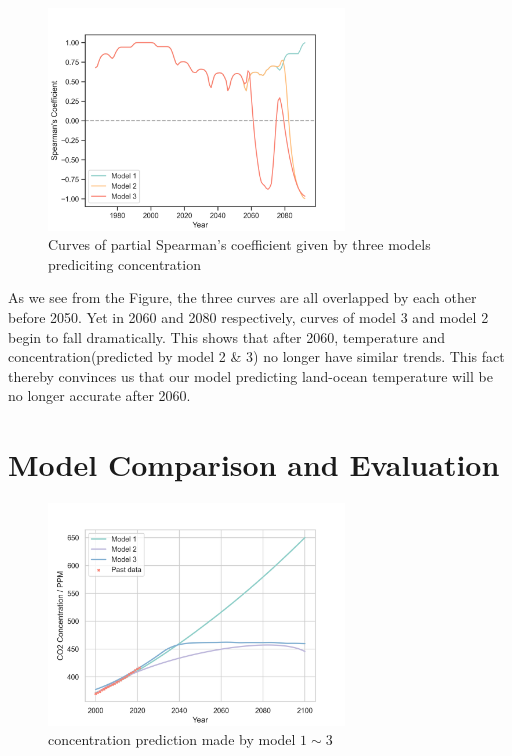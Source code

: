 \documentclass[12pt]{article}
\begin{document}
\begin{figure}[hbt]
    \centering
    \includegraphics[width = 0.7\textwidth]{fig/2b.png}
    \caption{Curves of partial Spearman's coefficient given by three models prediciting  concentration}
    \label{m5:fig}
\end{figure}

As we see from the Figure, the three curves are all overlapped by each other before 2050. Yet in 2060 and 2080 respectively, curves of model 3 and model 2 begin to fall dramatically. This shows that after 2060, temperature and  concentration(predicted by model 2 \& 3) no longer have similar trends. This fact thereby convinces us that our model predicting land-ocean temperature will be no longer accurate after 2060. 

\section{Model Comparison and Evaluation}

\begin{figure}[hbt]
    \centering
    \includegraphics[width = 0.7\textwidth]{fig/General Projections.png}
    \caption{ concentration prediction made by model $1\sim 3$}
    \label{general}
\end{figure}
\end{document}
